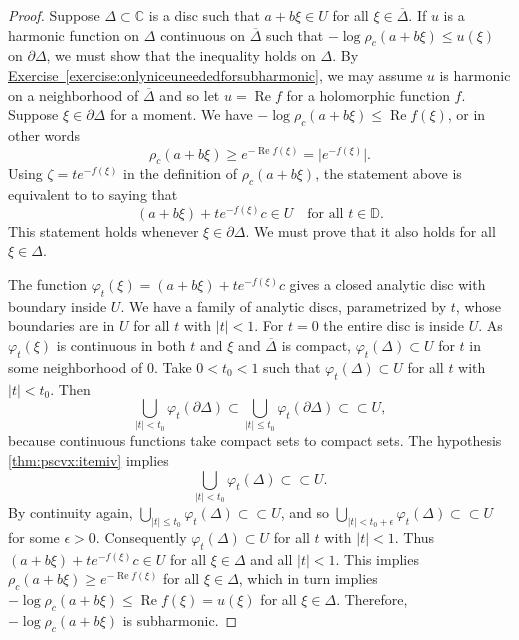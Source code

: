 \documentclass[12pt,openany]{book}
\renewcommand{\Re}{\operatorname{Re}}
\newcommand{\sabs}[1]{\lvert {#1} \rvert}
\newcommand{\babs}[1]{\bigl\lvert {#1} \bigr\rvert}
\newcommand{\C}{{\mathbb{C}}}
\newcommand{\D}{{\mathbb{D}}}
\theoremstyle{plain}
\theoremstyle{remark}
\theoremstyle{definition}
\theoremstyle{exercise}
\theoremstyle{example}
\newcommand{\exerciseref}[1]{\hyperref[#1]{Exercise~\ref*{#1}}}
\begin{document}
\begin{proof}
Suppose $\Delta \subset \C$ is a disc such that
$a+b\xi \in U$
for all $\xi \in
\overline{\Delta}$.
If $u$ is a harmonic function on $\Delta$ continuous on $\overline{\Delta}$
such that
$- \log \rho_c(a+b\xi) \leq u(\xi)$ on $\partial \Delta$, we must
show that the inequality holds on $\Delta$.
By \exerciseref{exercise:onlyniceuneededforsubharmonic},
we may assume $u$ is harmonic on a neighborhood of $\overline{\Delta}$
and so let $u = \Re f$ for a holomorphic function $f$.
Suppose $\xi \in \partial \Delta$ for a moment.
We have  $- \log \rho_c(a+b\xi) \leq \Re
f(\xi)$,
or in other words
\begin{equation*}
\rho_c(a+b\xi) \geq e^{-\Re f(\xi)} = \babs{e^{-f(\xi)}}.
\end{equation*}
Using $\zeta = t e^{-f(\xi)}$ in the definition of $\rho_c(a+b\xi)$, the
statement above is equivalent to
to saying that
\begin{equation*}
(a+b\xi)+te^{-f(\xi)}c \in U \quad \text{for all $t \in \D$}.
\end{equation*}
This statement holds whenever $\xi \in \partial \Delta$.  We must prove that
it also holds for all $\xi \in \Delta$.

The function $\varphi_t(\xi) =
(a+b\xi)+te^{-f(\xi)}c$ gives a closed analytic disc with boundary inside
$U$.  We have a family of analytic discs, parametrized by $t$, whose boundaries are in
$U$ for all $t$ with $\sabs{t} < 1$.  For $t=0$ the entire disc is
inside $U$.  As $\varphi_t(\xi)$ is continuous in both $t$ and $\xi$ and
$\overline{\Delta}$ is compact,
$\varphi_t(\Delta) \subset U$ for $t$ in some neighborhood of $0$.
Take $0 < t_0 < 1$ such that
$\varphi_t(\Delta) \subset U$ for all $t$ with $\sabs{t} < t_0$.
Then
\begin{equation*}
\bigcup_{\sabs{t} < t_0} \varphi_t(\partial \Delta)
\subset
\bigcup_{\sabs{t} \leq t_0} \varphi_t(\partial \Delta)
\subset \subset U ,
\end{equation*}
because continuous functions take compact sets to compact sets.
The hypothesis \ref{thm:pscvx:itemiv} implies
\begin{equation*}
\bigcup_{\sabs{t} < t_0} \varphi_t(\Delta)
\subset \subset U  .
\end{equation*}
By continuity again,
$\bigcup_{\sabs{t} \leq t_0} \varphi_t(\Delta)
\subset \subset U$, and so
$\bigcup_{\sabs{t} < t_0+\epsilon} \varphi_t(\Delta)
\subset \subset U$
for some $\epsilon > 0$.
Consequently $\varphi_t(\Delta) \subset U$
for all $t$ with $\sabs{t} < 1$.  Thus
$(a+b\xi)+te^{-f(\xi)}c \in U$ for all $\xi \in \Delta$ and all $\sabs{t} <
1$.  This implies $\rho_c(a+b\xi) \geq e^{-\Re f(\xi)}$ for all $\xi \in
\Delta$, which in
turn implies $-\log \rho_c(a+b\xi) \leq \Re f(\xi) = u(\xi)$ for all $\xi
\in \Delta$.
Therefore, $-\log \rho_c(a+b\xi)$ is subharmonic.
\end{proof}
\end{document}
